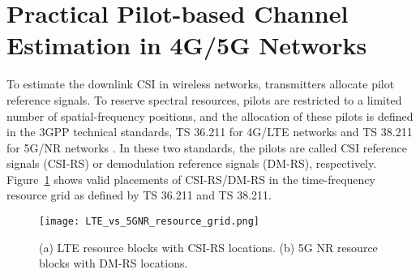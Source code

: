 \section{Practical Pilot-based Channel Estimation in 4G/5G Networks}
\label{sect:pilots}

To estimate the downlink CSI in wireless networks, transmitters allocate pilot reference signals. To reserve spectral resources, pilots are restricted to a limited number of spatial-frequency positions, and the allocation of these pilots is defined in the 3GPP technical standards, TS 36.211 for 4G/LTE networks \cite{ref:3gpp.36.211} and TS 38.211 for 5G/NR networks \cite{ref:3GPPTS38.211V15.8.0}. In these two standards, the pilots are called CSI reference signals (CSI-RS) or demodulation reference signals (DM-RS), respectively. Figure~\ref{fig:lte-vs-5g} shows valid placements of CSI-RS/DM-RS in the time-frequency resource grid as defined by TS 36.211 and TS 38.211.

\begin{figure}[!hbtp]
    \centering
    \texttt{[image: LTE\_vs\_5GNR\_resource\_grid.png]}
    \caption{(a) LTE resource blocks with CSI-RS locations. (b) 5G NR resource blocks with DM-RS locations.}
    \label{fig:lte-vs-5g}
\end{figure}

